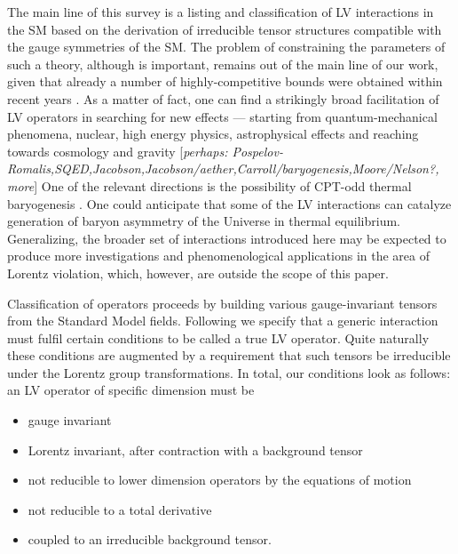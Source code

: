 \documentclass[12pt,preprintnumbers,nofootinbib]{revtex4}
\begin{document}
	The main line of this survey is a listing and
	classification of LV interactions in the SM based on the derivation of irreducible
	tensor structures compatible with the gauge symmetries of the SM.
	The problem of constraining the parameters of such a theory, although
	is important, remains out of the main line of our work, given
	that already a number of highly-competitive bounds were obtained
	within recent years 
\cite{CG,Ted1,Gagnon:2004xh}.
	As a matter of fact,
	one can find a strikingly broad 
	facilitation of LV operators in searching for new effects ---
	starting from quantum-mechanical phenomena, nuclear, high energy physics,
	astrophysical effects and reaching towards cosmology and gravity
	[{\it perhaps:
	Pospelov-Romalis,SQED,Jacobson,Jacobson/aether,Carroll/baryogenesis,Moore/Nelson?, more}]
	One of the relevant directions is the possibility of CPT-odd
	thermal baryogenesis
\cite{Bertolami:1996cq,Carroll:2005dj,Bolokhov_lepto}.
	One could anticipate that some of the LV interactions can catalyze 
	generation of baryon asymmetry of the Universe in thermal equilibrium.
	Generalizing, the broader set of interactions introduced here may be expected to 
	produce more investigations and phenomenological applications in the area of
	Lorentz violation, which, however, are outside the scope of this paper. 

	Classification of operators proceeds by building various gauge-invariant tensors
	from the Standard Model fields. 
	Following 
\cite{MP:} we specify that a generic interaction must
	fulfil certain conditions to be called a true LV operator. 
	Quite naturally these conditions are augmented by a requirement that such
	tensors be irreducible under the Lorentz group transformations.
	In total, our conditions look as follows: 
	an LV operator of specific dimension must be
\begin{itemize}
	\item gauge invariant
	\item Lorentz invariant, after contraction with a background tensor
	\item not reducible to lower dimension operators by the equations
		of motion
	\item not reducible to a total derivative
	\item coupled to an irreducible background tensor.
\end{itemize}
\end{document}
